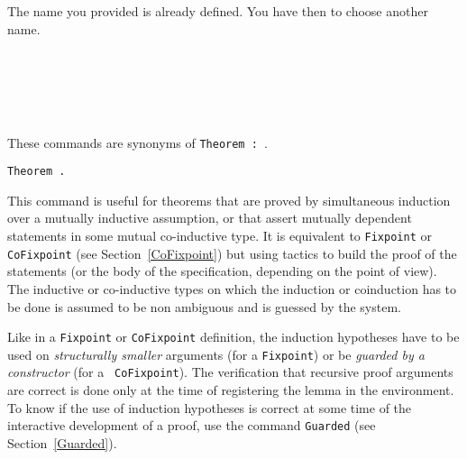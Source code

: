 \begin{ErrMsgs}

\item {}

\item {}
 
  The name you provided is already defined. You have then to choose
  another name.

\end{ErrMsgs}

\begin{Variants} 
\item {}\\
  {}\\
  {}\\
  {}\\
  {}

These commands are synonyms of \texttt{Theorem {\ident} \zeroone{\binders} : {\type}}.

\item {\tt Theorem .}

This command is useful for theorems that are proved by simultaneous
induction over a mutually inductive assumption, or that assert mutually
dependent statements in some mutual co-inductive type. It is equivalent
to {\tt Fixpoint} or {\tt CoFixpoint}
(see Section~\ref{CoFixpoint}) but using tactics to build the proof of
the statements (or the body of the specification, depending on the
point of view). The inductive or co-inductive types on which the
induction or coinduction has to be done is assumed to be non ambiguous
and is guessed by the system. 

Like in a {\tt Fixpoint} or {\tt CoFixpoint} definition, the induction
hypotheses have to be used on {\em structurally smaller} arguments
(for a {\tt Fixpoint}) or be {\em guarded by a constructor} (for a {\tt
  CoFixpoint}).  The verification that recursive proof arguments are
correct is done only at the time of registering the lemma in the
environment. To know if the use of induction hypotheses is correct at
some time of the interactive development of a proof, use the command
{\tt Guarded} (see Section~\ref{Guarded}).


\end{Variants}
